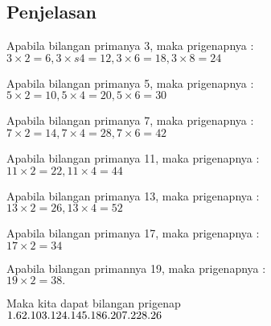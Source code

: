 \documentclass{article}
\begin{document}
\subsection*{Penjelasan}
Apabila bilangan primanya 3, maka prigenapnya : \\
$3 \times 2 = 6, 3\times  s4 = 12, 3\times6 = 18, 3\times 8 = 24 $

Apabila bilangan primanya 5, maka prigenapnya :\\
$5 \times 2 = 10, 5 \times 4 = 20, 5\times 6 = 30$

Apabila bilangan primanya 7, maka prigenapnya :\\
$7 \times 2 = 14, 7 \times 4 = 28, 7 \times 6 = 42$

Apabila bilangan primanya 11, maka prigenapnya : \\
$ 11 \times 2 = 22, 11 \times 4 = 44 $

Apabila bilangan primanya 13, maka prigenapnya :\\
$ 13 \times 2 = 26, 13 \times  4 = 52 $

Apabila bilangan primanya 17, maka prigenapnya : \\
$ 17 \times 2 = 34$

Apabila bilangan primannya 19, maka prigenapnya :\\
$ 19 \times 2 = 38. $

Maka kita dapat bilangan prigenap \\

$
1. 6 \\
2. 10 \\
3. 12\\
4. 14\\
5. 18\\
6. 20\\
7. 22\\
8. 26\\
$


\pagebreak
\end{document}

